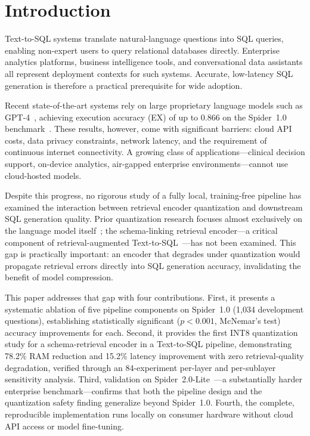 \section{Introduction}
\label{sec:intro}

Text-to-SQL systems translate natural-language questions into SQL queries,
enabling non-expert users to query relational databases directly.
Enterprise analytics platforms, business intelligence tools, and conversational
data assistants all represent deployment contexts for such systems.
Accurate, low-latency SQL generation is therefore a practical prerequisite
for wide adoption.

Recent state-of-the-art systems rely on large proprietary language models
such as GPT-4~\citep{openai2023gpt4}, achieving execution accuracy (EX) of
up to 0.866 on the Spider~1.0 benchmark~\citep{gao2023dailsql}.
These results, however, come with significant barriers: cloud API costs,
data privacy constraints, network latency, and the requirement of continuous
internet connectivity.
A growing class of applications---clinical decision support, on-device
analytics, air-gapped enterprise environments---cannot use cloud-hosted models.

Despite this progress, no rigorous study of a fully local, training-free
pipeline has examined the interaction between retrieval encoder quantization
and downstream SQL generation quality.
Prior quantization research focuses almost exclusively on the language model
itself~\citep{dettmers2022llmint8,xiao2023smoothquant,
shen2020qbert,zafrir2019q8bert};
the schema-linking retrieval encoder---a critical component of
retrieval-augmented Text-to-SQL~\citep{gao2023dailsql,eben2025rasl}---has
not been examined.
This gap is practically important: an encoder that degrades under
quantization would propagate retrieval errors directly into SQL generation
accuracy, invalidating the benefit of model compression.

This paper addresses that gap with four contributions.
First, it presents a systematic ablation of five pipeline components on
Spider~1.0 (1{,}034 development questions), establishing statistically
significant ($p < 0.001$, McNemar's test) accuracy improvements for each.
Second, it provides the first INT8 quantization study for a schema-retrieval
encoder in a Text-to-SQL pipeline, demonstrating 78.2\% RAM reduction and
15.2\% latency improvement with zero retrieval-quality degradation, verified
through an 84-experiment per-layer and per-sublayer sensitivity analysis.
Third, validation on Spider~2.0-Lite~\citep{lei2025spider2}---a substantially
harder enterprise benchmark---confirms that both the pipeline design and the
quantization safety finding generalize beyond Spider~1.0.
Fourth, the complete, reproducible implementation runs locally on consumer
hardware without cloud API access or model fine-tuning.

